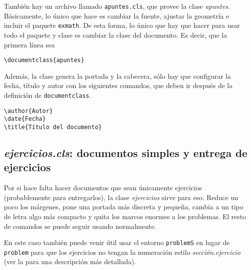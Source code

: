 También hay un archivo llamado \texttt{apuntes.cls}, que provee la clase \textit{apuntes}. Básicamente, lo único que hace es cambiar la fuente, ajustar la geometría e incluir el paquete \texttt{exmath}. De esta forma, lo único que hay que hacer para usar todo el paquete y clase es cambiar la clase del documento. Es decir, que la primera línea sea

\begin{verbatim}
\documentclass{apuntes}
\end{verbatim}

Además, la clase genera la portada y la cabecera, sólo hay que configurar la fecha, título y autor con los siguientes comandos, que deben ir después de la definición de \texttt{documentclass}.

\begin{verbatim}
\author{Autor}
\date{Fecha}
\title{Título del documento}
\end{verbatim}

\subsection{\textit{ejercicios.cls}: documentos simples y entrega de ejercicios}
\label{sec:EjerciciosCls}

Por si hace falta hacer documentos que sean únicamente ejercicios (probablemente para entregarlos), la clase \textit{ejercicios} sirve para eso. Reduce un poco los márgenes, pone una portada más discreta y pequeña, cambia a un tipo de letra algo más compacto y quita los marcos enormes a los problemas. El resto de comandos se puede seguir usando normalmente.

En este caso también puede venir útil usar el entorno \texttt{problemS} en lugar de \texttt{problem} para que los ejercicios no tengan la numeración estilo \textit{sección.ejercicio} (ver la  para una descripción más detallada).

